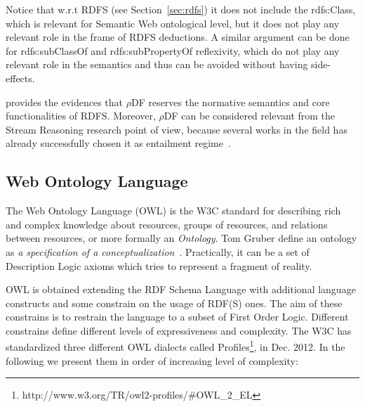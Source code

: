 Notice that w.r.t RDFS (see Section~\ref{sec:rdfs}) it does not include the rdfs:Class, which is relevant for Semantic Web ontological level, but it does not play any relevant role in the frame of RDFS deductions. A similar argument can be done for rdfs:subClassOf and rdfs:subPropertyOf reflexivity, which do not play any relevant role in the semantics and thus can be avoided without having side-effects.

\cite{DBLP:conf/esws/MunozPG07} provides the evidences that $\rho$DF reserves the normative semantics and core functionalities of RDFS. Moreover,  $\rho$DF can be considered relevant from  the Stream Reasoning research point of view, because several works in the field  has already successfully chosen it as entailment regime~\cite{DBLP:conf/semweb/UrbaniMJHB13, Liu:2014:ERS:2567948.2577323}.

\subsection{Web Ontology Language}\label{sec:owl}

The Web Ontology Language (OWL) is the W3C standard for describing rich and complex knowledge about resources, groups of resources, and relations between resources, or more formally an \textit{Ontology}. Tom Gruber define an ontology as \textit{a specification of a conceptualization}~\cite{Gruber:1993:TAP:173743.173747}. Practically, it can be a set of Description Logic axioms which tries to represent a fragment of reality. 

OWL is obtained extending the RDF Schema Language with additional language constructs and some constrain on the usage of RDF(S)  ones. The aim of these constrains is to restrain the language to a subset of First Order Logic. Different constrains define different levels of expressiveness and complexity. The W3C has standardized three different OWL dialects called Profiles\footnote{http://www.w3.org/TR/owl2-profiles/\#OWL\_2\_EL}, in Dec. 2012. In the following we present them in order of increasing level of complexity:

